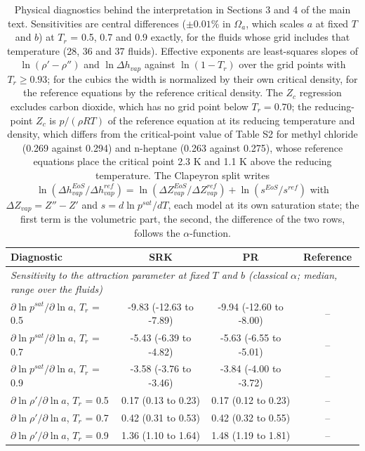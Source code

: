 \begin{table}[H]
\centering
\caption{Physical diagnostics behind the interpretation in Sections 3 and 4 of the main text. Sensitivities are central differences ($\pm 0.01\%$ in $\Omega_a$, which scales $a$ at fixed $T$ and $b$) at $T_r$ = 0.5, 0.7 and 0.9 exactly, for the fluids whose grid includes that temperature (28, 36 and 37 fluids). Effective exponents are least-squares slopes of $\ln(\rho' - \rho'')$ and $\ln \Delta h_{vap}$ against $\ln(1 - T_r)$ over the grid points with $T_r \ge 0.93$; for the cubics the width is normalized by their own critical density, for the reference equations by the reference critical density. The $Z_c$ regression excludes carbon dioxide, which has no grid point below $T_r = 0.70$; the reducing-point $Z_c$ is $p/(\rho R T)$ of the reference equation at its reducing temperature and density, which differs from the critical-point value of Table S2 for methyl chloride (0.269 against 0.294) and n-heptane (0.263 against 0.275), whose reference equations place the critical point 2.3 K and 1.1 K above the reducing temperature. The Clapeyron split writes $\ln(\Delta h_{vap}^{EoS}/\Delta h_{vap}^{ref}) = \ln(\Delta Z_{vap}^{EoS}/\Delta Z_{vap}^{ref}) + \ln(s^{EoS}/s^{ref})$ with $\Delta Z_{vap} = Z'' - Z'$ and $s = d\ln p^{sat}/dT$, each model at its own saturation state; the first term is the volumetric part, the second, the difference of the two rows, follows the $\alpha$-function.}
\label{tab:tabS_physics}
\small
\begin{tabular}{p{6.2cm}ccc}
\toprule
Diagnostic & SRK & PR & Reference \\
\midrule
\multicolumn{4}{l}{\emph{Sensitivity to the attraction parameter at fixed $T$ and $b$ (classical $\alpha$; median, range over the fluids)}} \\
$\partial \ln p^{sat}/\partial \ln a$, $T_r$ = 0.5 & -9.83 (-12.63 to -7.89) & -9.94 (-12.60 to -8.00) & -- \\
$\partial \ln p^{sat}/\partial \ln a$, $T_r$ = 0.7 & -5.43 (-6.39 to -4.82) & -5.63 (-6.55 to -5.01) & -- \\
$\partial \ln p^{sat}/\partial \ln a$, $T_r$ = 0.9 & -3.58 (-3.76 to -3.46) & -3.84 (-4.00 to -3.72) & -- \\
$\partial \ln \rho'/\partial \ln a$, $T_r$ = 0.5 & 0.17 (0.13 to 0.23) & 0.17 (0.12 to 0.23) & -- \\
$\partial \ln \rho'/\partial \ln a$, $T_r$ = 0.7 & 0.42 (0.31 to 0.53) & 0.42 (0.32 to 0.55) & -- \\
$\partial \ln \rho'/\partial \ln a$, $T_r$ = 0.9 & 1.36 (1.10 to 1.64) & 1.48 (1.19 to 1.81) & -- \\

\end{tabular}
\end{table}
